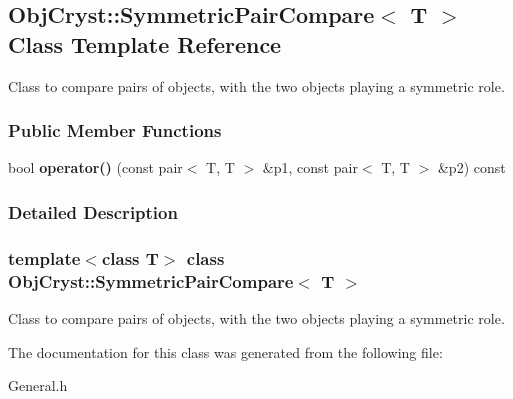 \subsection{ObjCryst::SymmetricPairCompare$<$ T $>$ Class Template Reference}
\label{a00102}


Class to compare pairs of objects, with the two objects playing a symmetric role.  
\subsubsection*{Public Member Functions}
\begin{DoxyCompactItemize}
\item 
bool {\bfseries operator()} (const pair$<$ T, T $>$ \&p1, const pair$<$ T, T $>$ \&p2) const \label{a00102_a210b2707d39d9354dba198a0a288c3ab}

\end{DoxyCompactItemize}


\subsubsection{Detailed Description}
\subsubsection*{template$<$class T$>$ class ObjCryst::SymmetricPairCompare$<$ T $>$}

Class to compare pairs of objects, with the two objects playing a symmetric role. 

The documentation for this class was generated from the following file:\begin{DoxyCompactItemize}
\item 
General.h\end{DoxyCompactItemize}
